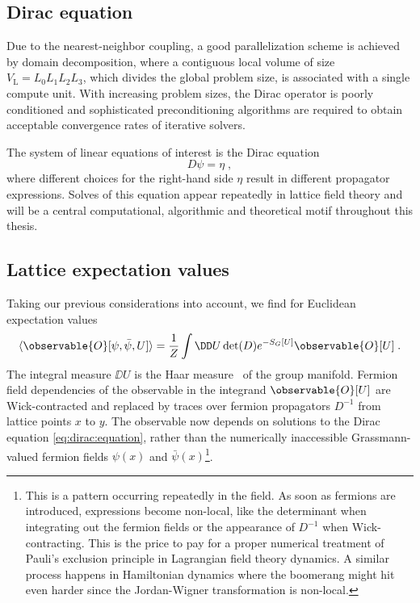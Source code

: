 \subsection{Dirac equation}

Due to the nearest-neighbor coupling, a good parallelization scheme is achieved by domain decomposition, where a contiguous local volume of size $V_\mathrm{L}=L_0 L_1 L_2 L_3$, which divides the global problem size, is associated with a single compute unit.
With increasing problem sizes, the Dirac operator is poorly conditioned and sophisticated preconditioning algorithms are required to obtain acceptable convergence rates of iterative solvers.

The system of linear equations of interest is the Dirac equation
\begin{equation} \label{eq:dirac:equation}
  D \psi = \eta \;,
\end{equation}
where different choices for the right-hand side $\eta$ result in different propagator expressions.
Solves of this equation appear repeatedly in lattice field theory and will be a central computational, algorithmic and theoretical motif throughout this thesis.

\subsection{Lattice expectation values}

Taking our previous considerations into account, we find for Euclidean expectation values
\begin{equation} \label{eq:eclidean:exp:value}
\langle \observable{O}[\psi, \bar{\psi}, U] \rangle =
\frac{1}{Z}
\int \DD U
\det(D) e^{- S_G[U]}
\observable{O}[U] \;.
\end{equation}
The integral measure $\DD U$ is the Haar measure~\cite{haar1933} of the group manifold.
Fermion field dependencies of the observable in the integrand $\observable{O}[U]$ are Wick-contracted and replaced by traces over fermion propagators $D^{-1}$ from lattice points $x$ to $y$.
The observable now depends on solutions to the Dirac equation \cref{eq:dirac:equation}, rather than the numerically inaccessible Grassmann-valued fermion fields $\psi(x)$ and $\bar{\psi}(x)$\footnote{This is a pattern occurring repeatedly in the field. As soon as fermions are introduced, expressions become non-local, like the determinant when integrating out the fermion fields or the appearance of $D^{-1}$ when Wick-contracting. This is the price to pay for a proper numerical treatment of Pauli's exclusion principle in Lagrangian field theory dynamics. A similar process happens in Hamiltonian dynamics where the boomerang might hit even harder since the Jordan-Wigner transformation is non-local.}.

